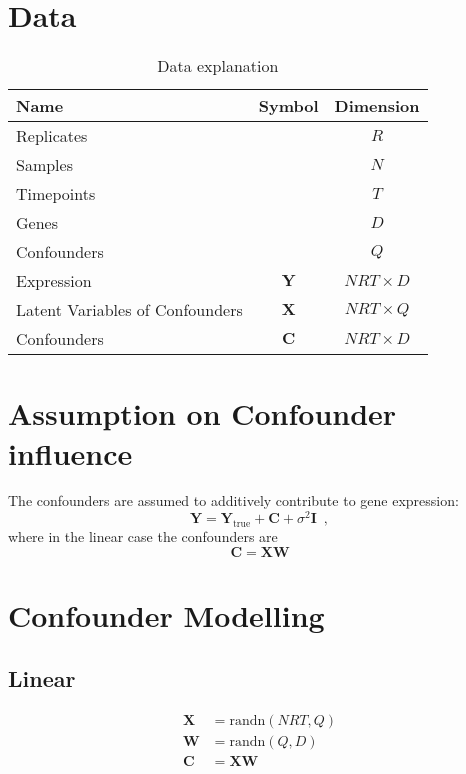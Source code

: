 \documentclass[a4paper,tablecaptionabove]{article}
\newcommand{\matr}[1]{\ensuremath{\boldsymbol{\mathbf #1}}}
\begin{document}
\section{Data}
\label{sec:data}

\begin{table}[h]
  \centering
  \begin{tabular}{lcc}
    \toprule
    Name & Symbol & Dimension\\
    \midrule
    Replicates && $R$  \\
    Samples && $N$ \\
    Timepoints && $T$ \\
    Genes && $D$ \\
    Confounders && $Q$ \\
    Expression & $\matr Y$ & $NRT\times D$\\
    Latent Variables of Confounders & $\matr X$ & $NRT\times Q$\\
    Confounders & $\matr C$ & $NRT\times D$\\
    \bottomrule
  \end{tabular}
  \caption{Data explanation}
  \label{tab:data}
\end{table}

\section{Assumption on Confounder influence}
\label{sec:assumpt-conf-infl}

The confounders are assumed to additively contribute to gene
expression:
\begin{equation}
  \label{eq:5}
  \matr Y = \matr Y_\text{true} + \matr C + \sigma^2\matr I\enspace,
\end{equation}
where in the linear case the confounders are
\begin{equation}
  \label{eq:6}
  \matr C = \matr{XW}
\end{equation}

\section{Confounder Modelling}
\label{sec:confounder-modelling}

\subsection{Linear}
\label{sec:linear}

\begin{align}
  \matr{X} & = \text{randn}(NRT,Q)\\
  \matr{W} & = \text{randn}(Q,D)\\
  \matr{C} & = \matr{XW}
\end{align}
\end{document}
